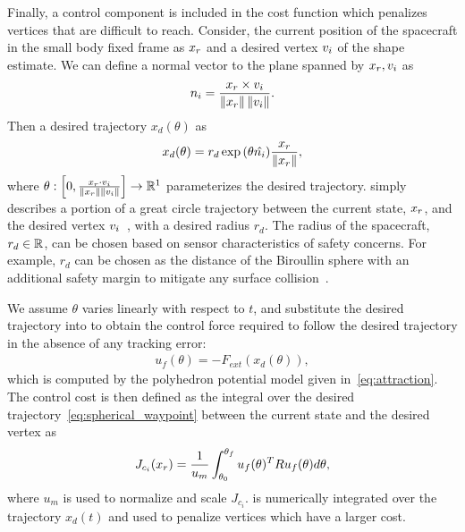 \documentclass[journal]{new-aiaa}
\begin{document}
Finally, a control component is included in the cost function which penalizes vertices that are difficult to reach.
Consider, the current position of the spacecraft in the small body fixed frame as \( x_r\) and a desired vertex \( v_i \) of the shape estimate.
We can define a normal vector to the plane spanned by \( x_r, v_i \) as
\begin{align}\label{eq:normal_to_plane}
    n_i = \frac{x_r \times v_i}{\left\| x_r \right\| \left\| v_i \right\|}.
\end{align}
Then a desired trajectory \( x_d(\theta) \) as
\begin{align}\label{eq:spherical_waypoint}
    x_d(\theta) = r_d \exp{\ensuremath{\left( \theta \hat{n_i} \right)} } \frac{x_r}{\left\| x_r \right\|},
\end{align}
where \( \theta : \left[ 0, \frac{x_r \cdot v_i}{\left\| x_r \right\|\left\| v_i \right\|} \right] \to \mathbb{R}^1\) parameterizes the desired trajectory.
 simply describes a portion of a great circle trajectory between the current state, \( x_r \), and the desired vertex \( v_i \)~\cite{chen2016}, with a desired radius $r_d$.
The radius of the spacecraft, \( r_d \in \mathbb{R} \), can be chosen based on sensor characteristics of safety concerns.
For example, \( r_d \) can be chosen as the distance of the Biroullin sphere with an additional safety margin to mitigate any surface collision~\cite{scheeres2012a}.

We assume $\theta$ varies linearly with respect to $t$, and substitute the desired trajectory into  to obtain the control force required to follow the desired trajectory in the absence of any tracking error:
\begin{align}\label{eq:tracking_control_cost}
    u_f(\theta) = -F_{ext}(x_d(\theta)), 
\end{align}
which is computed by the polyhedron potential model given in~\cref{eq:attraction}.
The control cost is then defined as the integral over the desired trajectory~\cref{eq:spherical_waypoint} between the current state and the desired vertex as
\begin{align}\label{eq:control_cost}
    J_{c_i}(x_r) = \frac{1}{u_m} \int_{\theta_0}^{\theta_f} u_f(\theta)^T R u_f(\theta) d\theta,
\end{align}
where \( u_m \) is used to normalize and scale \( J_{c_i} \).
 is numerically integrated over the trajectory \( x_d(t) \) and used to penalize vertices which have a larger cost.
\end{document}

